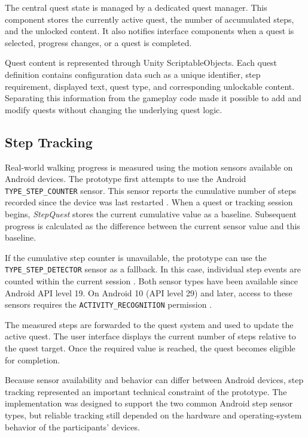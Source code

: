 The central quest state is managed by a dedicated quest manager. This component stores the currently active quest, the number of accumulated steps, and the unlocked content. It also notifies interface components when a quest is selected, progress changes, or a quest is completed.

Quest content is represented through Unity ScriptableObjects. Each quest definition contains configuration data such as a unique identifier, step requirement, displayed text, quest type, and corresponding unlockable content. Separating this information from the gameplay code made it possible to add and modify quests without changing the underlying quest logic.
\subsection{Step Tracking}

Real-world walking progress is measured using the motion sensors available on Android devices. The prototype first attempts to use the Android \texttt{TYPE\_STEP\_COUNTER} sensor. This sensor reports the cumulative number of steps recorded since the device was last restarted \cite{AndroidStepCounterSensor}. When a quest or tracking session begins, \textit{StepQuest} stores the current cumulative value as a baseline. Subsequent progress is calculated as the difference between the current sensor value and this baseline.

If the cumulative step counter is unavailable, the prototype can use the \texttt{TYPE\_STEP\_DETECTOR} sensor as a fallback. In this case, individual step events are counted within the current session \cite{AndroidStepDetectorSensor}. Both sensor types have been available since Android API level 19. On Android 10 (API level 29) and later, access to these sensors requires the \texttt{ACTIVITY\_RECOGNITION} permission \cite{AndroidMotionSensors}.

The measured steps are forwarded to the quest system and used to update the active quest. The user interface displays the current number of steps relative to the quest target. Once the required value is reached, the quest becomes eligible for completion.

Because sensor availability and behavior can differ between Android devices, step tracking represented an important technical constraint of the prototype. The implementation was designed to support the two common Android step sensor types, but reliable tracking still depended on the hardware and operating-system behavior of the participants' devices.
